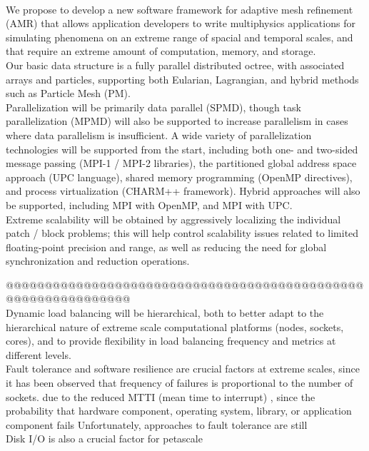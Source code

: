 \documentclass[14pt,letter]{article}
\begin{document}
\ \\ 
We propose to develop a new software framework for adaptive mesh
refinement (AMR) that allows application developers to write
multiphysics applications for simulating phenomena on an extreme range
of spacial and temporal scales, and that require an extreme amount of
computation, memory, and storage.
%
%
\ \\ 
Our basic data structure is a fully parallel distributed octree, with
associated arrays and particles, supporting both Eularian, Lagrangian,
and hybrid methods such as Particle Mesh (PM).
%
\ \\  Parallelization will be
primarily data parallel (SPMD), though task parallelization (MPMD)
will also be supported to increase parallelism in cases where data
parallelism is insufficient.  A wide variety of parallelization
technologies will be supported from the start, including both one- and
two-sided message passing (MPI-1 / MPI-2 libraries), the partitioned
global address space approach (UPC language), shared memory
programming (OpenMP directives), and process virtualization (CHARM++
framework).  Hybrid approaches will also be supported, including MPI
with OpenMP, and MPI with UPC.
%
\ \\ 
Extreme scalability will be obtained by aggressively localizing the
individual patch / block problems; this will help control scalability issues
related to limited floating-point precision and range, as well as
reducing the need for global synchronization and reduction operations.

@@@@@@@@@@@@@@@@@@@@@@@@@@@@@@@@@@@@@@@@@@@@@@@@@@@@@@@@@@@@@@ \ \\
 Dynamic load balancing will be hierarchical,
both to better adapt to the hierarchical nature of extreme scale
computational platforms (nodes, sockets, cores), and to provide
flexibility in load balancing frequency and metrics at different
levels.
%
\ \\ 
Fault tolerance and software resilience are crucial factors at extreme scales,
since it has been observed that frequency of failures is proportional to
the number of sockets.
due to the reduced MTTI (mean time to interrupt) , since the probability that hardware component, operating system, library, or application component fails Unfortunately, approaches to fault tolerance are still 
%
\ \\ 
Disk I/O is also a crucial factor for petascale 
\end{document}
